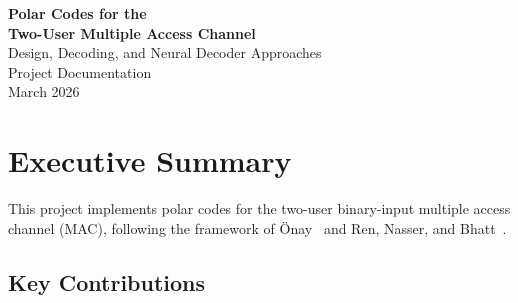 \documentclass[11pt,a4paper]{article}
\begin{document}
\begin{titlepage}
\centering
\vspace*{3cm}
{\Huge\bfseries Polar Codes for the\\[0.3em] Two-User Multiple Access Channel}\\[1.5cm]
{\Large Design, Decoding, and Neural Decoder Approaches}\\[2cm]
{\large Project Documentation}\\[1cm]
{\large March 2026}\\[3cm]
\begin{abstract}
\noindent
This document provides a comprehensive description of a software library for
polar codes on the two-user binary-input multiple access channel (MAC).
The project supports three channel models---Binary Erasure MAC (BEMAC),
Additive Binary Noise MAC (ABNMAC), and Gaussian MAC---with both
analytical and Monte Carlo code design.
Five decoder implementations are provided, ranging from an $O(N^2)$
reference decoder to an $O(N \log N)$ computational graph decoder
supporting all monotone chain decoding paths, a Numba-JIT parallel
decoder, and an SC List (SCL) decoder.
The project also includes a neural decoder based on the computational
graph framework, using learned MLP operations for tree operations
including a fully neural CalcParent.
Extensive simulation results (BLER vs.\ block length, SNR sweeps, rate
analysis) are presented for all channel models and code classes.
\end{abstract}
\end{titlepage}

\tableofcontents
\newpage

\section{Executive Summary}
\label{sec:executive}

This project implements polar codes for the two-user binary-input multiple
access channel (MAC), following the framework of \"{O}nay~\cite{onay2013}
and Ren, Nasser, and Bhatt~\cite{ren2025}.

\subsection{Key Contributions}
\end{document}
